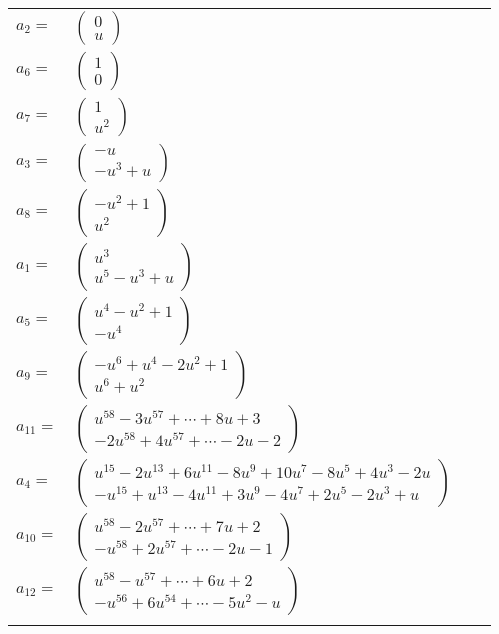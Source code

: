 \documentclass[1p]{elsarticle_modified}
\theoremstyle{definition}
\begin{document}
\begin{tabular}{m{7pt} m{180pt} m{7pt} m{180pt} }
\flushright $a_{2}=$&$\begin{pmatrix}0\\u\end{pmatrix}$ \\
\flushright $a_{6}=$&$\begin{pmatrix}1\\0\end{pmatrix}$ \\
\flushright $a_{7}=$&$\begin{pmatrix}1\\u^2\end{pmatrix}$ \\
\flushright $a_{3}=$&$\begin{pmatrix}- u\\- u^3+u\end{pmatrix}$ \\
\flushright $a_{8}=$&$\begin{pmatrix}- u^2+1\\u^2\end{pmatrix}$ \\
\flushright $a_{1}=$&$\begin{pmatrix}u^3\\u^5- u^3+u\end{pmatrix}$ \\
\flushright $a_{5}=$&$\begin{pmatrix}u^4- u^2+1\\- u^4\end{pmatrix}$ \\
\flushright $a_{9}=$&$\begin{pmatrix}- u^6+u^4-2 u^2+1\\u^6+u^2\end{pmatrix}$ \\
\flushright $a_{11}=$&$\begin{pmatrix}u^{58}-3 u^{57}+\cdots+8 u+3\\-2 u^{58}+4 u^{57}+\cdots-2 u-2\end{pmatrix}$ \\
\flushright $a_{4}=$&$\begin{pmatrix}u^{15}-2 u^{13}+6 u^{11}-8 u^9+10 u^7-8 u^5+4 u^3-2 u\\- u^{15}+u^{13}-4 u^{11}+3 u^9-4 u^7+2 u^5-2 u^3+u\end{pmatrix}$ \\
\flushright $a_{10}=$&$\begin{pmatrix}u^{58}-2 u^{57}+\cdots+7 u+2\\- u^{58}+2 u^{57}+\cdots-2 u-1\end{pmatrix}$ \\
\flushright $a_{12}=$&$\begin{pmatrix}u^{58}- u^{57}+\cdots+6 u+2\\- u^{56}+6 u^{54}+\cdots-5 u^2- u\end{pmatrix}$\\&\end{tabular}
\end{document}
